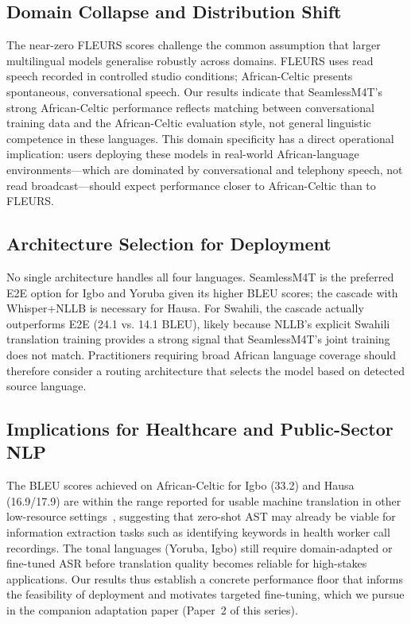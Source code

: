 \documentclass[11pt,a4paper]{article}
\newcommand{\dataAC}{African-Celtic}
\begin{document}
\subsection{Domain Collapse and Distribution Shift}
The near-zero FLEURS scores challenge the common assumption that larger multilingual models generalise robustly across domains. FLEURS uses read speech recorded in controlled studio conditions; \dataAC{} presents spontaneous, conversational speech. Our results indicate that SeamlessM4T's strong \dataAC{} performance reflects matching between conversational training data and the \dataAC{} evaluation style, not general linguistic competence in these languages. This domain specificity has a direct operational implication: users deploying these models in real-world African-language environments—which are dominated by conversational and telephony speech, not read broadcast—should expect performance closer to \dataAC{} than to FLEURS.

\subsection{Architecture Selection for Deployment}
No single architecture handles all four languages. SeamlessM4T is the preferred E2E option for Igbo and Yoruba given its higher BLEU scores; the cascade with Whisper+NLLB is necessary for Hausa. For Swahili, the cascade actually outperforms E2E (24.1 vs. 14.1 BLEU), likely because NLLB's explicit Swahili translation training provides a strong signal that SeamlessM4T's joint training does not match. Practitioners requiring broad African language coverage should therefore consider a routing architecture that selects the model based on detected source language.

\subsection{Implications for Healthcare and Public-Sector NLP}
The BLEU scores achieved on \dataAC{} for Igbo (33.2) and Hausa (16.9/17.9) are within the range reported for usable machine translation in other low-resource settings~\citep{nekoto2020participatory}, suggesting that zero-shot AST may already be viable for information extraction tasks such as identifying keywords in health worker call recordings. The tonal languages (Yoruba, Igbo) still require domain-adapted or fine-tuned ASR before translation quality becomes reliable for high-stakes applications. Our results thus establish a concrete performance floor that informs the feasibility of deployment and motivates targeted fine-tuning, which we pursue in the companion adaptation paper (Paper~2 of this series).
\end{document}
